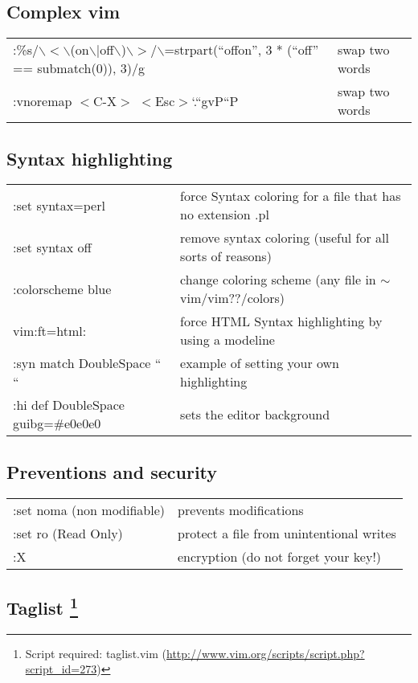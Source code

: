 \subsection{Complex vim}
\begin{center}
\begin{longtable}{l|l}
:\%s/$\backslash$$<$$\backslash$(on$\backslash$$|$off$\backslash$)$\backslash$$>$/$\backslash$=strpart(``offon'', 3 * (``off'' == submatch(0)), 3)/g & swap two words\\
:vnoremap $<$C-X$>$ $<$Esc$>$`.``gvP``P & swap two words
\end{longtable}
\end{center}

\subsection{Syntax highlighting}
\begin{center}
\begin{longtable}{l|l}
 :set syntax=perl & force Syntax coloring for a file that has no extension .pl\\
 :set syntax off & remove syntax coloring (useful for all sorts of reasons)\\
 :colorscheme blue & change coloring scheme (any file in $\sim$vim/vim??/colors)\\
 vim:ft=html: & force HTML Syntax highlighting by using a modeline\\
 :syn match DoubleSpace `` `` & example of setting your own highlighting\\
 :hi def DoubleSpace guibg=\#e0e0e0 & sets the editor background
\end{longtable}
\end{center}

\subsection{Preventions and security}
\begin{center}
\begin{longtable}{l|l}
 :set noma (non modifiable) & prevents modifications\\
 :set ro (Read Only) & protect a file from unintentional writes\\
 :X & encryption (do not forget your key!)
\end{longtable}
\end{center}

\subsection[Taglist]
{Taglist \footnote{Script required: taglist.vim (\href{http://www.vim.org/scripts/script.php?script\_id=273}{http://www.vim.org/scripts/script.php?script\_id=273})}}

